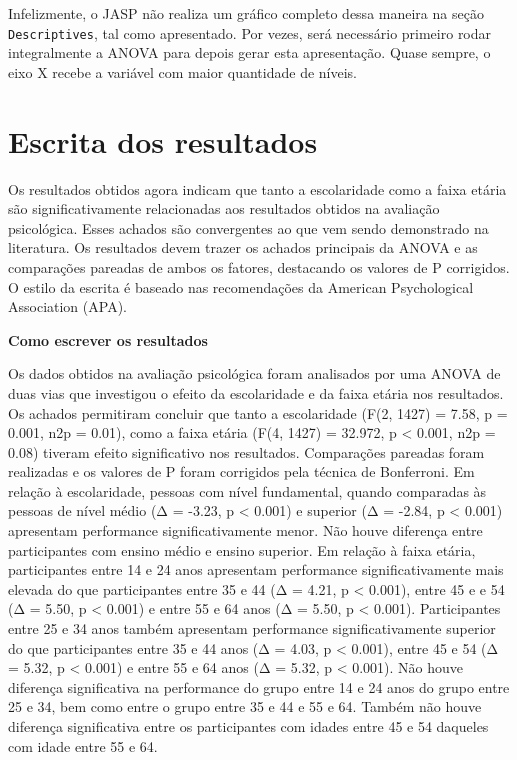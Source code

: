 \documentclass[
]{book}
\begin{document}
Infelizmente, o JASP não realiza um gráfico completo dessa maneira na seção \texttt{Descriptives}, tal como apresentado. Por vezes, será necessário primeiro rodar integralmente a ANOVA para depois gerar esta apresentação. Quase sempre, o eixo X recebe a variável com maior quantidade de níveis.

\hypertarget{escrita-dos-resultados-6}{%
\section{Escrita dos resultados}\label{escrita-dos-resultados-6}}

Os resultados obtidos agora indicam que tanto a escolaridade como a faixa etária são significativamente relacionadas aos resultados obtidos na avaliação psicológica. Esses achados são convergentes ao que vem sendo demonstrado na literatura. Os resultados devem trazer os achados principais da ANOVA e as comparações pareadas de ambos os fatores, destacando os valores de P corrigidos. O estilo da escrita é baseado nas recomendações da American Psychological Association (APA).

\begin{writing}
\textbf{Como escrever os resultados}

Os dados obtidos na avaliação psicológica foram analisados por uma ANOVA
de duas vias que investigou o efeito da escolaridade e da faixa etária
nos resultados. Os achados permitiram concluir que tanto a escolaridade
(F(2, 1427) = 7.58, p = 0.001, n2p = 0.01), como a faixa etária (F(4,
1427) = 32.972, p \textless{} 0.001, n2p = 0.08) tiveram efeito
significativo nos resultados. Comparações pareadas foram realizadas e os
valores de P foram corrigidos pela técnica de Bonferroni. Em relação à
escolaridade, pessoas com nível fundamental, quando comparadas às
pessoas de nível médio (Δ = -3.23, p \textless{} 0.001) e superior (Δ =
-2.84, p \textless{} 0.001) apresentam performance significativamente
menor. Não houve diferença entre participantes com ensino médio e ensino
superior. Em relação à faixa etária, participantes entre 14 e 24 anos
apresentam performance significativamente mais elevada do que
participantes entre 35 e 44 (Δ = 4.21, p \textless{} 0.001), entre 45 e
e 54 (Δ = 5.50, p \textless{} 0.001) e entre 55 e 64 anos (Δ = 5.50, p
\textless{} 0.001). Participantes entre 25 e 34 anos também apresentam
performance significativamente superior do que participantes entre 35 e
44 anos (Δ = 4.03, p \textless{} 0.001), entre 45 e 54 (Δ = 5.32, p
\textless{} 0.001) e entre 55 e 64 anos (Δ = 5.32, p \textless{} 0.001).
Não houve diferença significativa na performance do grupo entre 14 e 24
anos do grupo entre 25 e 34, bem como entre o grupo entre 35 e 44 e 55 e
64. Também não houve diferença significativa entre os participantes com
idades entre 45 e 54 daqueles com idade entre 55 e 64.
\end{writing}
\end{document}
